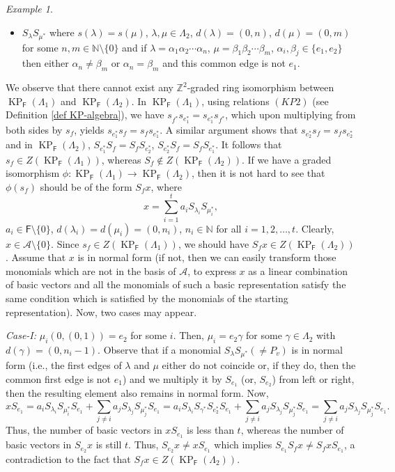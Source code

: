 \documentclass[12pt]{amsart}
\newcommand{\KP}{\operatorname{KP}}
\theoremstyle{definition}
\theoremstyle{remark}
\newtheorem{example}[thm]{Example}
\begin{document}
\begin{example}
\begin{itemize}
\item $S_\lambda S_{\mu^*}$ where $s(\lambda)=s(\mu)$, $\lambda,\mu\in \Lambda_2$, $d(\lambda)=(0,n)$, $d(\mu)=(0,m)$ for some $n,m\in \mathbb{N}\setminus \{0\}$ and if $\lambda=\alpha_1\alpha_2\cdots \alpha_n$, $\mu=\beta_1\beta_2\cdots \beta_m$, $\alpha_i,\beta_j\in \{e_1,e_2\}$ then either $\alpha_n\neq \beta_m$ or $\alpha_n=\beta_m$ and this common edge is not $e_1$. 
\end{itemize}

We observe that there cannot exist any $\mathbb{Z}^2$-graded ring isomorphism between $\KP_\mathsf{F}(\Lambda_1)$ and $\KP_\mathsf{F}(\Lambda_2)$. In $\KP_\mathsf{F}(\Lambda_1)$, using relations $(KP2)$ (see Definition \ref{def KP-algebra}), we have $s_{f^*}s_{e_1^*}=s_{e_1^*}s_{f^*}$, which upon multiplying from both sides by $s_f$, yields $s_{e_1^*}s_f=s_f s_{e_1^*}$. A similar argument shows that $s_{e_2^*}s_f=s_f s_{e_2^*}$ and in $\KP_\mathsf{F}(\Lambda_2)$, $S_{e_1^*}S_f=S_f S_{e_2^*}$, $S_{e_2^*} S_f=S_f S_{e_1^*}$. It follows that $s_f\in Z(\KP_\mathsf{F}(\Lambda_1))$, whereas $S_f\notin Z(\KP_\mathsf{F}(\Lambda_2))$. If we have a graded isomorphism $\phi:\KP_\mathsf{F}(\Lambda_1)\longrightarrow \KP_\mathsf{F}(\Lambda_2)$, then it is not hard to see that $\phi(s_f)$ should be of the form $S_f x$, where \[x=\displaystyle{\sum_{i=1}^{t}}a_iS_{\lambda_i}S_{\mu_i^*},\] $a_i\in \mathsf{F}\setminus \{0\}$, $d(\lambda_i)=d(\mu_i)=(0,n_i)$, $n_i\in \mathbb{N}$ for all $i=1,2,\ldots,t$. Clearly, $x\in \mathcal{A}\setminus \{0\}$. Since $s_f\in Z(\KP_\mathsf{F}(\Lambda_1))$, we should have $S_f x\in Z(\KP_\mathsf{F}(\Lambda_2))$. Assume that $x$ is in normal form (if not, then we can easily transform those monomials which are not in the basis of $\mathcal{A}$, to express $x$ as a linear combination of basic vectors and all the monomials of such a basic representation satisfy the same condition which is satisfied by the monomials of the starting representation). Now, two cases may appear.

\emph{Case-I:} $\mu_i(0,(0,1))=e_2$ for some $i$. Then, $\mu_i=e_2\gamma$ for some $\gamma\in \Lambda_2$ with $d(\gamma)=(0,n_i-1)$. Observe that if a monomial $S_\lambda S_{\mu^*}(\neq P_v)$ is in normal form (i.e., the first edges of $\lambda$ and $\mu$ either do not coincide or, if they do, then the common first edge is not $e_1$) and we multiply it by $S_{e_1}$ (or, $S_{e_2}$) from left or right, then the resulting element also remains in normal form. Now, \[xS_{e_1}=a_iS_{\lambda_i}S_{\mu_i^*}S_{e_1}+\displaystyle{\sum_{j\neq i}}a_jS_{\lambda_j}S_{\mu_j^*}S_{e_1}=a_iS_{\lambda_i}S_{\gamma^*}S_{e_2^*}S_{e_1}+\displaystyle{\sum_{j\neq i}}a_j S_{\lambda_j} S_{\mu_j^*}S_{e_1}=\displaystyle{\sum_{j\neq i}}a_j S_{\lambda_j} S_{\mu_j^*}S_{e_1}.\] Thus, the number of basic vectors in $xS_{e_1}$ is less than $t$, whereas the number of basic vectors in $S_{e_2}x$ is still $t$. Thus, $S_{e_2}x\neq xS_{e_1}$ which implies $S_{e_1}S_f x\neq S_f x S_{e_1}$, a contradiction to the fact that $S_f x\in Z(\KP_\mathsf{F}(\Lambda_2))$. 


\end{example}
\end{document}
